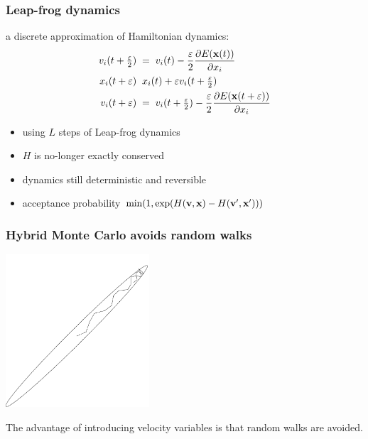\begin{frame}
\frametitle{Leap-frog dynamics}

a discrete approximation of Hamiltonian dynamics:
\[
\begin{split}
v_i(t+\tfrac{\varepsilon}{2})\;&=\;v_i(t)-\frac{\varepsilon}{2}\frac{\partial E(\mathbf x(t))}{\partial x_i}\\
x_i(t+\varepsilon)\;&\;x_i(t)+\varepsilon v_i(t+\tfrac{\varepsilon}{2})\\
v_i(t+\varepsilon)\;&=\;v_i(t+\tfrac{\varepsilon}{2})-\frac{\varepsilon}{2}\frac{\partial E(\mathbf x(t+\varepsilon))}{\partial x_i}
\end{split}
\]
\begin{itemize}
\item using $L$ steps of Leap-frog dynamics
\item $H$ is no-longer exactly conserved
\item dynamics still deterministic and reversible
\item acceptance probability $\min(1,\exp(H(\mathbf v,\mathbf x)-H(\mathbf v',\mathbf x')))$
\end{itemize}
\end{frame}

\begin{frame}
\frametitle{Hybrid Monte Carlo avoids random walks}

\begin{center}
\includegraphics[width=0.4\textwidth]{bvg-hybrid}
\end{center}

The advantage of introducing velocity variables is that random walks
are avoided.

\end{frame}


